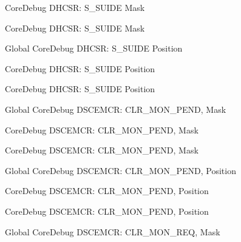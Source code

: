 \begin{DoxyRefList}
\label{deprecated__deprecated000569}%
%
Core\+Debug DHCSR\+: S\+\_\+\+SUIDE Mask 

\label{deprecated__deprecated000467}%
%
Core\+Debug DHCSR\+: S\+\_\+\+SUIDE Mask  
\item[Global \doxylink{group___c_m_s_i_s___s_c_b_gacff001d7e8c9665a1dc91018f2505d3d}{Core\+Debug\+\_\+\+DHCSR\+\_\+\+S\+\_\+\+SUIDE\+\_\+\+Pos} ]\label{deprecated__deprecated000015}%
%
Core\+Debug DHCSR\+: S\+\_\+\+SUIDE Position 

\label{deprecated__deprecated000466}%
%
Core\+Debug DHCSR\+: S\+\_\+\+SUIDE Position 

\label{deprecated__deprecated000568}%
%
Core\+Debug DHCSR\+: S\+\_\+\+SUIDE Position  
\item[Global \doxylink{group___c_m_s_i_s___s_c_b_gacfb17801664286ab627a094d5fb3da20}{Core\+Debug\+\_\+\+DSCEMCR\+\_\+\+CLR\+\_\+\+MON\+\_\+\+PEND\+\_\+\+Msk} ]\label{deprecated__deprecated000074}%
%
Core\+Debug DSCEMCR\+: CLR\+\_\+\+MON\+\_\+\+PEND, Mask 

\label{deprecated__deprecated000525}%
%
Core\+Debug DSCEMCR\+: CLR\+\_\+\+MON\+\_\+\+PEND, Mask 

\label{deprecated__deprecated000627}%
%
Core\+Debug DSCEMCR\+: CLR\+\_\+\+MON\+\_\+\+PEND, Mask  
\item[Global \doxylink{group___c_m_s_i_s___s_c_b_ga2295235d9c595bd6f287728f4c395bbf}{Core\+Debug\+\_\+\+DSCEMCR\+\_\+\+CLR\+\_\+\+MON\+\_\+\+PEND\+\_\+\+Pos} ]\label{deprecated__deprecated000073}%
%
Core\+Debug DSCEMCR\+: CLR\+\_\+\+MON\+\_\+\+PEND, Position 

\label{deprecated__deprecated000626}%
%
Core\+Debug DSCEMCR\+: CLR\+\_\+\+MON\+\_\+\+PEND, Position 

\label{deprecated__deprecated000524}%
%
Core\+Debug DSCEMCR\+: CLR\+\_\+\+MON\+\_\+\+PEND, Position  
\item[Global \doxylink{group___c_m_s_i_s___s_c_b_gaea36b8cede2cc1184176eb20b7bd0f8d}{Core\+Debug\+\_\+\+DSCEMCR\+\_\+\+CLR\+\_\+\+MON\+\_\+\+REQ\+\_\+\+Msk} ]\label{deprecated__deprecated000072}%
%
Core\+Debug DSCEMCR\+: CLR\+\_\+\+MON\+\_\+\+REQ, Mask 


\end{DoxyRefList}
